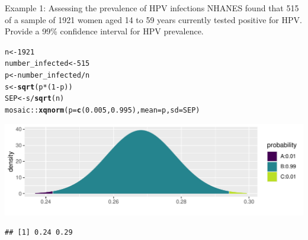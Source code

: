 \documentclass[10pt]{beamer}\usepackage[]{graphicx}\usepackage[]{color}
\makeatletter
\def\maxwidth{ %
  \ifdim\Gin@nat@width>\linewidth
    \linewidth
  \else
    \Gin@nat@width
  \fi
}
\newcommand{\hlnum}[1]{\textcolor[rgb]{0.686,0.059,0.569}{#1}}%
\newcommand{\hlopt}[1]{\textcolor[rgb]{0,0,0}{#1}}%
\newcommand{\hlstd}[1]{\textcolor[rgb]{0.345,0.345,0.345}{#1}}%
\newcommand{\hlkwb}[1]{\textcolor[rgb]{0.69,0.353,0.396}{#1}}%
\newcommand{\hlkwc}[1]{\textcolor[rgb]{0.333,0.667,0.333}{#1}}%
\newcommand{\hlkwd}[1]{\textcolor[rgb]{0.737,0.353,0.396}{\textbf{#1}}}%
\newenvironment{kframe}{%
 \def\at@end@of@kframe{}%
 \ifinner\ifhmode%
  \def\at@end@of@kframe{\end{minipage}}%
  \begin{minipage}{\columnwidth}%
 \fi\fi%
 \def\FrameCommand##1{\hskip\@totalleftmargin \hskip-\fboxsep
 \colorbox{shadecolor}{##1}\hskip-\fboxsep
     \hskip-\linewidth \hskip-\@totalleftmargin \hskip\columnwidth}%
 \MakeFramed {\advance\hsize-\width
   \@totalleftmargin\z@ \linewidth\hsize
   \@setminipage}}%
 {\par\unskip\endMakeFramed%
 \at@end@of@kframe}
\newenvironment{knitrout}{}{} %
\makeatother
\begin{document}
\begin{frame}[fragile]{Example 1: Assessing the prevalence of HPV infections}
	\small
	NHANES found that 515 of a sample of 1921 women aged 14 to 59 years currently tested positive for HPV. Provide a 99\% confidence interval for HPV prevalence. 
	
\begin{knitrout}\tiny
{}\color{fgcolor}\begin{kframe}
\begin{alltt}
\hlstd{n} \hlkwb{<-} \hlnum{1921}
\hlstd{number_infected} \hlkwb{<-} \hlnum{515}
\hlstd{p} \hlkwb{<-} \hlstd{number_infected} \hlopt{/} \hlstd{n}
\hlstd{s} \hlkwb{<-} \hlkwd{sqrt}\hlstd{(p} \hlopt{*} \hlstd{(}\hlnum{1} \hlopt{-} \hlstd{p))}
\hlstd{SEP} \hlkwb{<-} \hlstd{s} \hlopt{/} \hlkwd{sqrt}\hlstd{(n)}
\hlstd{mosaic}\hlopt{::}\hlkwd{xqnorm}\hlstd{(}\hlkwc{p}\hlstd{=}\hlkwd{c}\hlstd{(}\hlnum{0.005}\hlstd{,}\hlnum{0.995}\hlstd{),} \hlkwc{mean} \hlstd{= p,} \hlkwc{sd} \hlstd{= SEP)}
\end{alltt}
\end{kframe}

{\centering \includegraphics[width=\maxwidth]{figure/unnamed-chunk-13-1} 

}


\begin{kframe}\begin{verbatim}
## [1] 0.24 0.29
\end{verbatim}
\end{kframe}
\end{knitrout}
	
\end{frame}
\end{document}
